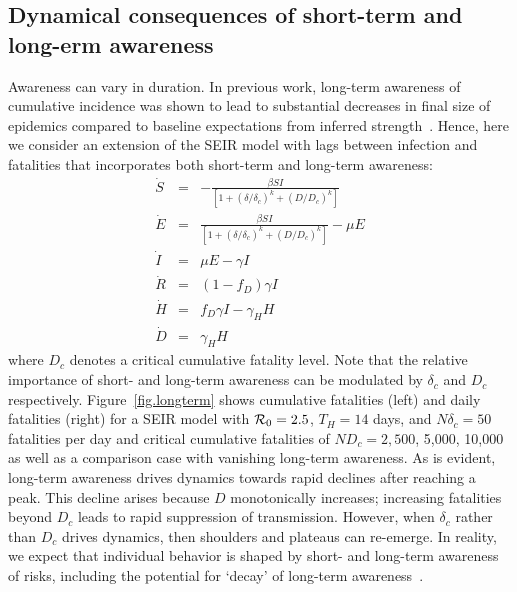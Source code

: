 \subsection{Dynamical consequences of short-term and long-erm awareness}
Awareness can vary in duration.  In previous
work, long-term awareness of cumulative incidence
was shown to lead to substantial decreases
in final size of epidemics compared
to baseline expectations from inferred 
strength~\citep{eksin2019systematic}. Hence, 
here we consider an extension of the SEIR model
with lags between infection and fatalities that incorporates
both short-term and long-term awareness:
\begin{eqnarray}
\dot{S} &=& -\frac{\beta SI}{\left[1+\left(\delta/\delta_c\right)^{k}+\left(D/D_c\right)^k\right]}\\
\dot{E} &=& \frac{\beta SI}{\left[1+\left(\delta/\delta_c\right)^{k}+\left(D/D_c\right)^k\right]}-\mu E\\
\dot{I} &=& \mu E-\gamma I \\
\dot{R} &=& (1-f_D)\gamma I\\
\dot{H} &=& f_D\gamma I - \gamma_H H\\
\dot{D} &=& \gamma_H H
\end{eqnarray}
where $D_c$ denotes a critical cumulative fatality level. 
Note that the relative importance of short- and long-term
awareness can be modulated by $\delta_c$ and $D_c$ respectively.
Figure~\ref{fig.longterm} shows cumulative fatalities (left)
and daily fatalities (right)
for a SEIR model with ${\cal{R}}_0=2.5$, $T_H=14$ days, and $N\delta_c=50$ 
fatalities per day and critical cumulative fatalities of
$ND_c=2,500$, 5,000, 10,000 as well as a comparison case with vanishing
long-term awareness. As is evident, 
long-term awareness drives dynamics towards rapid declines
after reaching a peak. This decline arises because
$D$ monotonically increases;
increasing fatalities beyond $D_c$ leads to rapid suppression
of transmission.  However, when $\delta_c$ rather than
$D_c$ drives dynamics, then shoulders and plateaus can re-emerge.
In reality, we expect that individual
behavior is shaped by short- and long-term awareness of risks, including
the potential for `decay' of long-term awareness~\citep{funk2009spread,funk2010modelling}.

